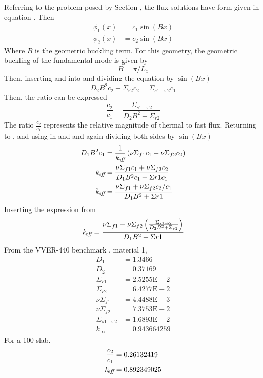   Referring to the problem posed by Section , the flux 
  solutions have form given in equation . Then
  \begin{align}
    \label{eq:twogroupflux1}
    \phi_1(x) &= c_1 \sin(Bx) \\
    \label{eq:twogroupflux2}
    \phi_2(x) &= c_2 \sin(Bx)
  \end{align}
  Where $B$ is the geometric buckling term. For this geometry, the geometric 
  buckling of the fundamental mode is given by 
  \begin{equation}
    B = \pi/L_x
  \end{equation}
  Then, inserting  and  into 
   and dividing the equation by $\sin(Bx)$
  \begin{equation}
    D_2 B^2 c_2 + \Sigma_{r2} c_2 = \Sigma_{s1\rightarrow2} c_1
  \end{equation}
  Then, the ratio can be expressed
  \begin{equation} \label{eq:fluxratio}
    \frac{c_2}{c_1} = \frac{\Sigma_{s1\rightarrow2}}{D_2 B^2 + \Sigma_{r2}}
  \end{equation}
  The ratio $\frac{c_2}{c_1}$ represents the relative magnitude of thermal to 
  fast flux. Returning to , and using in 
   and  and again dividing both
  sides by  $\sin(Bx)$
  \begin{align}
    D_1 B^2 c_1 &= \frac{1}{k_{\!\mbox{\scriptsize \em eff}}} \left( \nu \Sigma_{f1} c_1 + 
      \nu \Sigma_{f2} c_2\right)\\
    k_{\!\mbox{\scriptsize \em eff}} &= \frac{\nu \Sigma_{f1} c_1 + \nu \Sigma_{f2} c_2}
      {D_1 B^2 c_1 + \Sigma{r1} c_1}\\
    k_{\!\mbox{\scriptsize \em eff}} &= \frac{\nu \Sigma_{f1} + \nu \Sigma_{f2} c_2/c_1}
      {D_1 B^2 + \Sigma{r1}}
  \end{align}
  Inserting the expression from 
  \begin{equation}
    k_{\!\mbox{\scriptsize \em eff}} = \frac{\nu \Sigma_{f1} + \nu \Sigma_{f2} 
      \left(\frac{\Sigma_{s1\rightarrow2}}{D_2B^2+\Sigma_{r2}}\right)}
      {D_1 B^2 + \Sigma{r1}}
  \end{equation}
  From the VVER-440 benchmark , material 1,
  \begin{align*}
    D_1 &= 1.3466  \\
    D_2 &= 0.37169 \\
    \Sigma_{r1} &= 2.5255\text{E}-2\\
    \Sigma_{r2} &= 6.4277\text{E}-2\\
    \nu \Sigma_{f1}  &= 4.4488\text{E}-3\\
    \nu \Sigma_{f2}  &= 7.3753\text{E}-2\\
    \Sigma_{s1\rightarrow2} &= 1.6893\text{E}-2 \\
    k_{\infty} &= 0.943664259
  \end{align*}
  For a 100  slab.
  \begin{align}
    \frac{c_2}{c_1} &= 0.26132419 \\
    k_{\!\mbox{\scriptsize \em eff}} &= 0.892349025
  \end{align}
  
